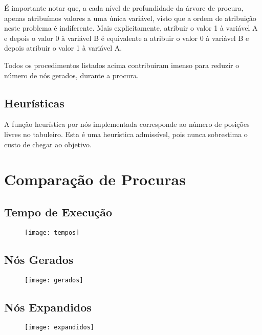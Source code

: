 \documentclass[12pt]{article}
\begin{document}
É importante notar que, a cada nível de profundidade da árvore de procura,
apenas atribuímos valores a uma única variável, visto que a ordem de atribuição
neste problema é indiferente. Mais explicitamente, atribuir o valor 1 à variável
A e depois o valor 0 à variável B é equivalente a atribuir o valor 0 à variável
B e depois atribuir o valor 1 à variável A.

Todos os procedimentos listados acima contribuiram imenso para reduzir o número
de nós gerados, durante a procura.

\subsection{Heurísticas}
A função heurística por nós implementada corresponde ao número de posições
livres no tabuleiro. Esta é uma heurística admissível, pois nunca sobrestima
o custo de chegar ao objetivo.


\section{Comparação de Procuras}

\subsection{Tempo de Execução}
\begin{figure}[h!]
\texttt{[image: tempos]}
\centering
\end{figure}

\subsection{Nós Gerados}
\begin{figure}[h!]
\texttt{[image: gerados]}
\centering
\end{figure}

\subsection{Nós Expandidos}
\begin{figure}[h!]
\texttt{[image: expandidos]}
\centering
\end{figure}
\end{document}
